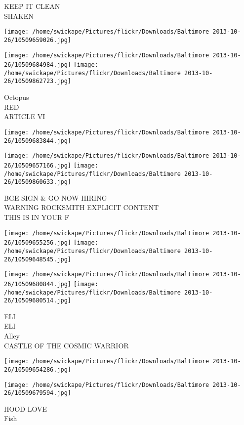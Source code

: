 \documentclass[10pt,letterpaper]{article}
\begin{document}
KEEP IT CLEAN\\
SHAKEN
\pagebreak

\texttt{[image: /home/swickape/Pictures/flickr/Downloads/Baltimore 2013-10-26/10509659026.jpg]}

\vspace{0.25in}
\texttt{[image: /home/swickape/Pictures/flickr/Downloads/Baltimore 2013-10-26/10509684984.jpg]}
\texttt{[image: /home/swickape/Pictures/flickr/Downloads/Baltimore 2013-10-26/10509862723.jpg]}

Octopus\\
RED\\
ARTICLE VI
\pagebreak

\texttt{[image: /home/swickape/Pictures/flickr/Downloads/Baltimore 2013-10-26/10509683844.jpg]}

\vspace{0.25in}
\texttt{[image: /home/swickape/Pictures/flickr/Downloads/Baltimore 2013-10-26/10509657166.jpg]}
\texttt{[image: /home/swickape/Pictures/flickr/Downloads/Baltimore 2013-10-26/10509860633.jpg]}

BGE SIGN \& GO NOW HIRING\\
WARNING ROCKSMITH EXPLICIT CONTENT\\
THIS IS IN YOUR F
\pagebreak

\texttt{[image: /home/swickape/Pictures/flickr/Downloads/Baltimore 2013-10-26/10509655256.jpg]}
\texttt{[image: /home/swickape/Pictures/flickr/Downloads/Baltimore 2013-10-26/10509648545.jpg]}

\texttt{[image: /home/swickape/Pictures/flickr/Downloads/Baltimore 2013-10-26/10509680844.jpg]}
\texttt{[image: /home/swickape/Pictures/flickr/Downloads/Baltimore 2013-10-26/10509680514.jpg]}

ELI\\
ELI\\
Alley\\
CASTLE OF THE COSMIC WARRIOR
\pagebreak

\texttt{[image: /home/swickape/Pictures/flickr/Downloads/Baltimore 2013-10-26/10509654286.jpg]}

\vspace{0.25in}
\texttt{[image: /home/swickape/Pictures/flickr/Downloads/Baltimore 2013-10-26/10509679594.jpg]}

HOOD LOVE\\
Fish
\pagebreak
\end{document}

